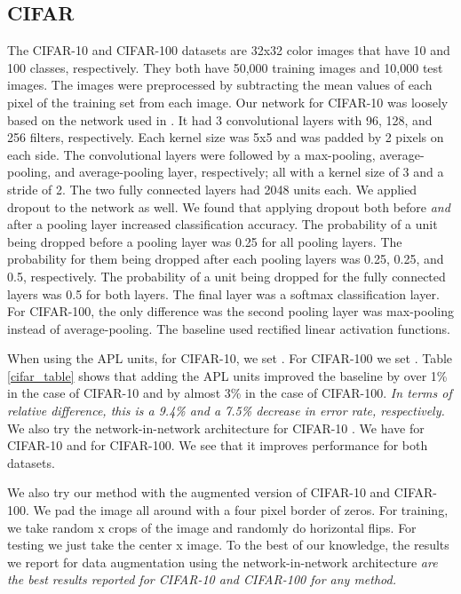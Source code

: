\documentclass{article} \usepackage{iclr2015,times}
\begin{document}
\subsection{CIFAR}
The CIFAR-10 and CIFAR-100 datasets \citep{cifar} are 32x32 color images that have 10 and 100 classes, respectively. They both have 50,000 training images and 10,000 test images. The images were preprocessed by subtracting the mean values of each pixel of the training set from each image. Our network for CIFAR-10 was loosely based on the network used in \citep{srivastava2014dropout}. It had 3 convolutional layers with 96, 128, and 256 filters, respectively. Each kernel size was 5x5 and was padded by 2 pixels on each side. The convolutional layers were followed by a max-pooling, average-pooling, and average-pooling layer, respectively; all with a kernel size of 3 and a stride of 2. The two fully connected layers had 2048 units each. We applied dropout \citep{hinton2012improving} to the network as well. We found that applying dropout both before \textit{and} after a pooling layer increased classification accuracy. The probability of a unit being dropped before a pooling layer was 0.25 for all pooling layers. The probability for them being dropped after each pooling layers was 0.25, 0.25, and 0.5, respectively. The probability of a unit being dropped for the fully connected layers was 0.5 for both layers. The final layer was a softmax classification layer. For CIFAR-100, the only difference was the second pooling layer was max-pooling instead of average-pooling. The baseline used rectified linear activation functions.

When using the APL units, for CIFAR-10, we set . For CIFAR-100 we set . Table \ref{cifar_table} shows that adding the APL units improved the baseline by over 1\% in the case of CIFAR-10 and by almost 3\% in the case of CIFAR-100. \textit{In terms of relative difference, this is a 9.4\% and a 7.5\% decrease in error rate, respectively.} We also try the network-in-network architecture for CIFAR-10 \citep{lin2013network}. We have  for CIFAR-10 and  for CIFAR-100. We see that it improves performance for both datasets.

We also try our method with the augmented version of CIFAR-10 and CIFAR-100. We pad the image all around with a four pixel border of zeros. For training, we take random  x  crops of the image and randomly do horizontal flips. For testing we just take the center  x  image. To the best of our knowledge, the results we report for data augmentation using the network-in-network architecture \textit{are the best results reported for CIFAR-10 and CIFAR-100 for any method.}
\end{document}
